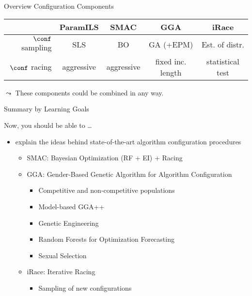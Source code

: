 \begin{frame}[c]{Overview Configuration Components}


\begin{table}
\begin{tabular}{r | cccc}
\toprule
& ParamILS & SMAC & GGA & iRace\\
\midrule
$\conf$ sampling & SLS & BO & GA (+EPM) & Est. of distr.\\
$\conf$ racing & aggressive & aggressive & fixed inc. length & statistical test\\
\bottomrule
\end{tabular}
\end{table}

\pause
\bigskip

$\leadsto$ These components could be combined in any way. 


\end{frame}

\begin{frame}[c]{Summary by Learning Goals}

Now, you should be able to \ldots

\begin{itemize}
  \item explain the ideas behind state-of-the-art algorithm configuration procedures
  \begin{itemize}
    \item SMAC: Bayesian Optimization (RF + EI) + Racing
    \item GGA: Gender-Based Genetic Algorithm for Algorithm Configuration
	\begin{itemize}
	  \item Competitive and non-competitive populations
	  \item Model-based GGA++
	  \item Genetic Engineering
	  \item Random Forests for Optimization Forecasting
	  \item Sexual Selection
	\end{itemize}
	\item iRace: Iterative Racing
    \begin{itemize}
      \item Sampling of new configurations
    \end{itemize}
  \end{itemize}
\end{itemize}

\end{frame}

